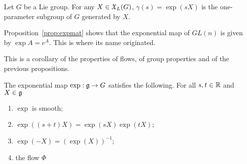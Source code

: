 \begin{exercise}
  Let $G$ be a Lie group. For any $X\in\mathfrak{X}_L(G)$, $\gamma(s) =\exp(sX)$ is the one-parameter subgroup of $G$ generated by $X$.
\end{exercise}

\begin{example}
  Proposition~\ref{prop:expmat} shows that the exponential map of $GL(n)$ is given by $\exp A = e^A$.
  This is where its name originated.
\end{example}

This is a corollary of the properties of flows, of group properties and of the previous propositions.
\begin{proposition}
  The exponential map $\exp: \mathfrak{g} \to G$ satisfies the following.
  For all $s,t\in\mathbb{R}$ and $X\in\mathfrak{g}$
  \begin{enumerate}
    \item $\exp$ is smooth;
    \item $\exp((s+t)X) = \exp(sX)\exp(tX)$;
    \item $\exp(-X) = (\exp(X))^{-1}$;
    \item the flow $\Phi$ \TODO
  \end{enumerate}
\end{proposition}
